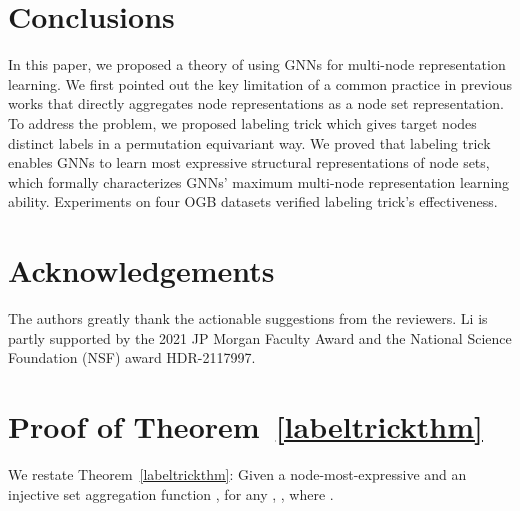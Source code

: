 \documentclass{article}
\begin{document}
\section{Conclusions}
In this paper, we proposed a theory of using GNNs for multi-node representation learning. We first pointed out the key limitation of a common practice in previous works that directly aggregates node representations as a node set representation. To address the problem, we proposed labeling trick which gives target nodes distinct labels in a permutation equivariant way. We proved that labeling trick enables GNNs to learn most expressive structural representations of node sets, which formally characterizes GNNs' maximum multi-node representation learning ability. Experiments on four OGB datasets verified labeling trick's effectiveness.










\section*{Acknowledgements}
The authors greatly thank the actionable suggestions from the reviewers. Li is partly supported by the 2021 JP Morgan Faculty Award and the National Science Foundation (NSF) award HDR-2117997.


































\newpage
\appendix

\setlength{\abovedisplayskip}{7pt plus2pt minus5pt}
\setlength{\belowdisplayskip}{7pt plus2pt minus5pt}

\section{Proof of Theorem~\ref{labeltrickthm}}

We restate Theorem~\ref{labeltrickthm}: Given a node-most-expressive  and an injective set aggregation function , for any , , where .
\end{document}
